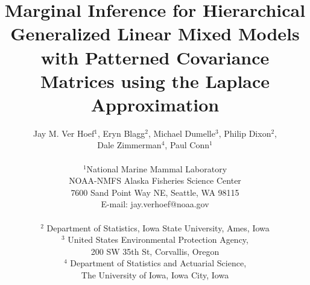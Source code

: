 \documentclass[12pt, titlepage]{article}
\begin{document}
\singlespacing

\titlepage
\title {Marginal Inference for Hierarchical Generalized Linear Mixed Models with Patterned Covariance Matrices using the Laplace Approximation}
\author{Jay M. Ver Hoef$^{1}$, Eryn Blagg$^{2}$, Michael Dumelle$^{3}$, Philip Dixon$^{2}$,  \\
 Dale Zimmerman$^{4}$, Paul Conn$^{1}$ \\
\hrulefill \\ 
$^{1}$National Marine Mammal Laboratory \\
NOAA-NMFS Alaska Fisheries Science Center\\
7600 Sand Point Way NE, Seattle, WA 98115\\
E-mail: jay.verhoef@noaa.gov\\
\hrulefill \\
$^{2}$ Department of Statistics, Iowa State University, Ames, Iowa \\
$^{3}$ United States Environmental Protection Agency, \\
	200 SW 35th St, Corvallis, Oregon \\
$^{4}$ Department of Statistics and Actuarial Science, \\
	The University of Iowa, Iowa City, Iowa \\
\hrulefill \\
}

\maketitle


\doublespacing

\end{document}
